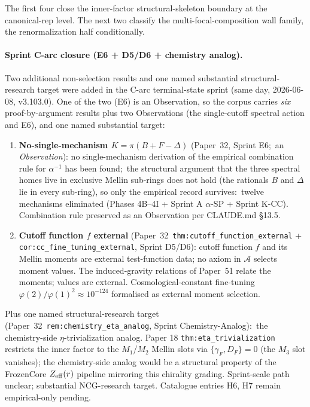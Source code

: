 \documentclass[11pt,a4paper]{article}
\theoremstyle{plain}
\theoremstyle{definition}
\begin{document}
The first four close the inner-factor structural-skeleton boundary at the canonical-rep level. The next two classify the multi-focal-composition wall family, the renormalization half conditionally.

\paragraph{Sprint C-arc closure (E6 + D5/D6 + chemistry analog).} Two additional non-selection results and one named substantial structural-research target were added in the C-arc terminal-state sprint (same day, 2026-06-08, v3.103.0). One of the two (E6) is an Observation, so the corpus carries \emph{six} proof-by-argument results plus two Observations (the single-cutoff spectral action and E6), and one named substantial target:

\begin{enumerate}\setlength{\itemsep}{1pt}\setcounter{enumi}{6}
  \item \textbf{No-single-mechanism $K = \pi(B + F - \Delta)$} (Paper~32, Sprint E6;\ an \emph{Observation}):  no single-mechanism derivation of the empirical combination rule for $\alpha^{-1}$ has been found;\ the structural argument that the three spectral homes live in exclusive Mellin sub-rings does not hold (the rationals $B$ and $\Delta$ lie in every sub-ring), so only the empirical record survives:\ twelve mechanisms eliminated (Phases 4B--4I + Sprint A $\alpha$-SP + Sprint K-CC).  Combination rule preserved as an Observation per CLAUDE.md \S 13.5.
  \item \textbf{Cutoff function $f$ external} (Paper~32~\texttt{thm:cutoff\_function\_external} + \texttt{cor:cc\_fine\_tuning\_external}, Sprint D5/D6):  cutoff function $f$ and its Mellin moments are external test-function data;  no axiom in $\mathcal{A}$ selects moment values.  The induced-gravity relations of Paper~51 relate the moments;  values are external.  Cosmological-constant fine-tuning $\varphi(2)/\varphi(1)^2 \approx 10^{-124}$ formalised as external moment selection.
\end{enumerate}

Plus one named structural-research target (Paper~32~\texttt{rem:chemistry\_eta\_analog}, Sprint Chemistry-Analog):\ the chemistry-side $\eta$-trivialization analog.  Paper 18 \texttt{thm:eta\_trivialization} restricts the inner factor to the $M_1$/$M_2$ Mellin slots via $\{\gamma_F, D_F\} = 0$ (the $M_3$ slot vanishes);  the chemistry-side analog would be a structural property of the FrozenCore $Z_{\rm eff}(r)$ pipeline mirroring this chirality grading.  Sprint-scale path unclear;  substantial NCG-research target.  Catalogue entries H6, H7 remain empirical-only pending.
\end{document}
